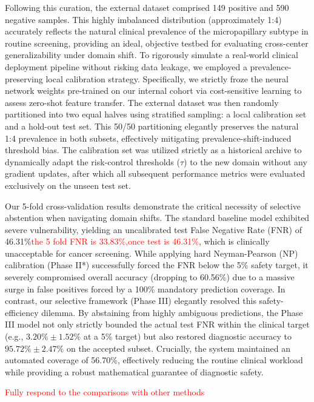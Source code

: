 \documentclass[UTF8,12pt]{article}
\begin{document}
Following this curation, the external dataset comprised 149 positive and 590 negative samples. This highly imbalanced distribution (approximately 1:4) accurately reflects the natural clinical prevalence of the micropapillary subtype in routine screening, providing an ideal, objective testbed for evaluating cross-center generalizability under domain shift. To rigorously simulate a real-world clinical deployment pipeline without risking data leakage, we employed a prevalence-preserving local calibration strategy. Specifically, we strictly froze the neural network weights pre-trained on our internal cohort via cost-sensitive learning to assess zero-shot feature transfer. The external dataset was then randomly partitioned into two equal halves using stratified sampling: a local calibration set and a hold-out test set. This 50/50 partitioning elegantly preserves the natural 1:4 prevalence in both subsets, effectively mitigating prevalence-shift-induced threshold bias. The calibration set was utilized strictly as a historical archive to dynamically adapt the risk-control thresholds ($\tau$) to the new domain without any gradient updates, after which all subsequent performance metrics were evaluated exclusively on the unseen test set.

Our 5-fold cross-validation results demonstrate the critical necessity of selective abstention when navigating domain shifts. The standard baseline model exhibited severe vulnerability, yielding an uncalibrated test False Negative Rate (FNR) of 46.31\%\textcolor{red}{the 5 fold FNR is 33.83\%,once test is 46.31\%}, which is clinically unacceptable for cancer screening. While applying hard Neyman-Pearson (NP) calibration (Phase II*) successfully forced the FNR below the 5\% safety target, it severely compromised overall accuracy (dropping to 60.56\%) due to a massive surge in false positives forced by a 100\% mandatory prediction coverage. In contrast, our selective framework (Phase III) elegantly resolved this safety-efficiency dilemma. By abstaining from highly ambiguous predictions, the Phase III model not only strictly bounded the actual test FNR within the clinical target (e.g., $3.20\% \pm 1.52\%$ at a 5\% target) but also restored diagnostic accuracy to $95.72\% \pm 2.47\%$ on the accepted subset. Crucially, the system maintained an automated coverage of 56.70\%, effectively reducing the routine clinical workload while providing a robust mathematical guarantee of diagnostic safety.

\textcolor{red}{Fully respond to the comparisons with other methods}
\end{document}
